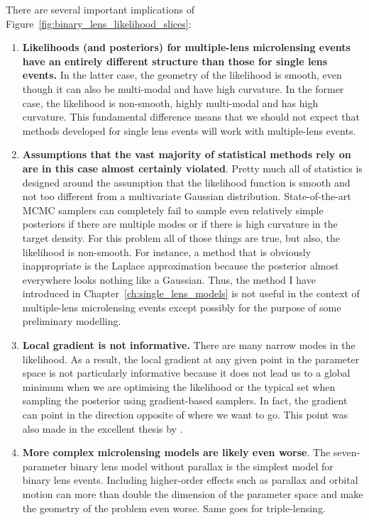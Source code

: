 \documentclass[12pt,dvipsnames]{report}
\begin{document}
There are several important implications of Figure~\ref{fig:binary_lens_likelihood_slices}:
\begin{enumerate}
    \item \textbf{Likelihoods (and posteriors) for multiple-lens microlensing events have 
    an entirely different structure than those for single lens events.}
    In the latter case, the geometry of the likelihood is smooth, even though it can also be 
    multi-modal and have high curvature. In the former case, the likelihood is non-smooth,
    highly multi-modal and has high curvature. This fundamental difference means 
    that we should not expect that methods developed for single lens events will work with 
    multiple-lens events. 
    \item \textbf{Assumptions that the vast majority of statistical methods rely on are in
    this case almost certainly violated}. Pretty much all of statistics is designed around the assumption that the 
    likelihood function is smooth and not too different from a multivariate Gaussian 
    distribution. State-of-the-art MCMC samplers can completely fail to sample even 
    relatively simple posteriors if there are multiple modes or if there is high 
    curvature in the target density. For this problem all of those things are true, but also, the 
    likelihood is non-smooth. For instance, a method that is obviously inappropriate 
    is the Laplace approximation because the posterior almost everywhere looks nothing 
    like a Gaussian. Thus, the method I have introduced in Chapter~\ref{ch:single_lens_models} 
    is not useful in the context of multiple-lens microlensing events except possibly for the purpose
    of some preliminary modelling.
    \item \textbf{Local gradient is not informative.} There are many narrow modes 
    in the likelihood.
    As a result, the local gradient at any given point in the parameter space is not 
    particularly informative because it does not lead us to a global minimum when we are 
    optimising the likelihood or the typical set when sampling the posterior using gradient-based 
    samplers. In fact, the gradient can point in the direction opposite of where we 
    want to go. This  point was also made in the excellent thesis by \citet{rajpaul2012}.
    \item \textbf{More complex microlensing models are likely even worse}. The seven-parameter 
    binary lens model without parallax is the simplest model for binary lens events. Including 
    higher-order effects such as parallax and orbital motion can more than double the 
    dimension of the parameter space and make the geometry of the problem even worse. Same 
    goes for triple-lensing. 
\end{enumerate}
\end{document}

